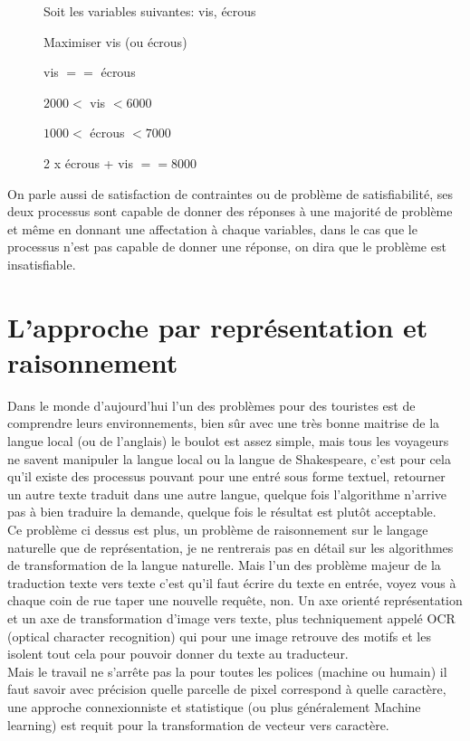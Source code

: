 \begin{description}
\item[] Soit les variables suivantes: vis, écrous
\item[] Maximiser vis (ou écrous)
\item[] vis $==$ écrous
\item[] $2000 <$ vis $< 6000$
\item[] $1000 <$ écrous $< 7000$
\item[] 2 x écrous + vis $== 8000$
\end{description}

On parle aussi de satisfaction de contraintes ou de problème de satisfiabilité, ses deux processus sont capable de donner des réponses à une majorité de problème et même en donnant une affectation à chaque variables, dans le cas que le processus n'est pas capable de donner une réponse, on dira que le problème est insatisfiable.

\pagebreak

\section{L'approche par représentation et raisonnement}

Dans le monde d'aujourd'hui l'un des problèmes pour des touristes est de comprendre leurs environnements, bien sûr avec une très bonne maitrise de la langue local (ou de l'anglais) le boulot est assez simple, mais tous les voyageurs ne savent manipuler la langue local ou la langue de Shakespeare, c'est pour cela qu'il existe des processus pouvant pour une entré sous forme textuel, retourner un autre texte traduit dans une autre langue, quelque fois l'algorithme n'arrive pas à bien traduire la demande, quelque fois le résultat est plutôt acceptable.\\
Ce problème ci dessus est plus, un problème de raisonnement sur le langage naturelle que de représentation, je ne rentrerais pas en détail sur les algorithmes de transformation de la langue naturelle. Mais l'un des problème majeur de la traduction texte vers texte c'est qu'il faut écrire du texte en entrée, voyez vous à chaque coin de rue taper une nouvelle requête, non. Un axe orienté représentation et un axe de transformation d'image vers texte, plus techniquement appelé OCR (optical character recognition) qui pour une image retrouve des motifs et les isolent tout cela pour pouvoir donner du texte au traducteur.\\
Mais le travail ne s'arrête pas la  pour toutes les polices (machine ou humain) il faut savoir avec précision quelle parcelle de pixel correspond à quelle caractère, une approche connexionniste et statistique (ou plus généralement Machine learning) est requit pour la transformation de vecteur vers caractère.

\pagebreak

